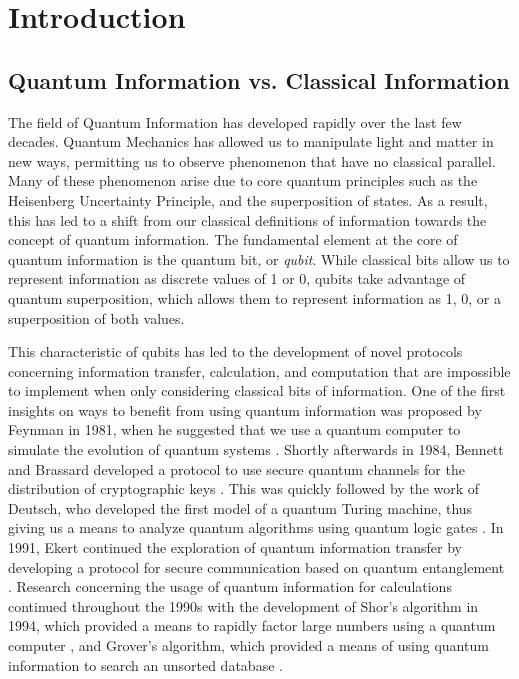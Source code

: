 \chapter*{Introduction}
\label{introduction} 

\section{Quantum Information vs. Classical Information}

The field of Quantum Information has developed rapidly over the last few
decades.  Quantum Mechanics has allowed us to manipulate light and matter in new ways, permitting us to observe phenomenon that have no classical parallel.  Many of
these phenomenon arise due to core quantum principles such as the Heisenberg
Uncertainty Principle, and the superposition of states.  As a result, this has led to a shift from our classical definitions of information towards the concept of quantum information.  The fundamental element at the core of
quantum information is the quantum bit, or \emph{qubit}.  While classical bits
allow us to represent information as discrete values of 1 or 0, qubits take
advantage of quantum superposition, which allows them to represent information as 1, 0, or a superposition of both values.

This characteristic of qubits has led to the development of novel protocols
concerning information transfer, calculation, and computation that are
impossible to implement when only considering classical bits of information.  One of the first insights on ways to benefit from using quantum information was proposed by Feynman in 1981, when he suggested that we use a quantum computer to
simulate the evolution of quantum systems \cite{feynman1982simulating}.
Shortly afterwards in 1984, Bennett and Brassard developed a protocol to use
secure quantum channels for the distribution of cryptographic keys
\cite{Bennett84}.  This was quickly followed by the work of Deutsch, who
developed the first model of a quantum Turing machine, thus giving us a means to
analyze quantum algorithms using quantum logic gates \cite{Deutsch85}.
In 1991, Ekert continued the exploration of quantum information transfer by
developing a protocol for secure communication based on quantum entanglement
\cite{Ekert91}.  Research concerning the usage of quantum information for
calculations continued throughout the 1990s with the development of Shor's
algorithm in 1994, which provided a means to rapidly factor large numbers
using a quantum computer \cite{Shor94}, and Grover's algorithm, which provided a
means of using quantum information to search an unsorted database
\cite{Grover96}. 

